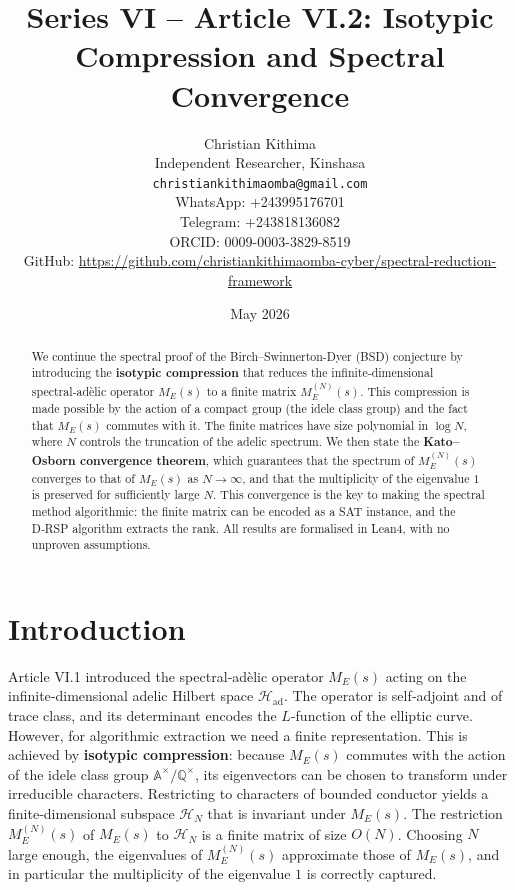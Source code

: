 \documentclass[11pt,a4paper]{article}
\title{Series VI – Article VI.2: Isotypic Compression and Spectral Convergence}
\author{Christian Kithima \\
Independent Researcher, Kinshasa \\
\texttt{christiankithimaomba@gmail.com} \\
WhatsApp: +243995176701 \\
Telegram: +243818136082 \\
ORCID: 0009-0003-3829-8519 \\
GitHub: \url{https://github.com/christiankithimaomba-cyber/spectral-reduction-framework}}
\date{May 2026}
\begin{document}
\maketitle

\begin{abstract}
We continue the spectral proof of the Birch–Swinnerton-Dyer (BSD) conjecture by introducing the \textbf{isotypic compression} that reduces the infinite‑dimensional spectral‑adèlic operator \(M_E(s)\) to a finite matrix \(M_E^{(N)}(s)\). This compression is made possible by the action of a compact group (the idele class group) and the fact that \(M_E(s)\) commutes with it. The finite matrices have size polynomial in \(\log N\), where \(N\) controls the truncation of the adelic spectrum. We then state the \textbf{Kato–Osborn convergence theorem}, which guarantees that the spectrum of \(M_E^{(N)}(s)\) converges to that of \(M_E(s)\) as \(N\to\infty\), and that the multiplicity of the eigenvalue \(1\) is preserved for sufficiently large \(N\). This convergence is the key to making the spectral method algorithmic: the finite matrix can be encoded as a SAT instance, and the D‑RSP algorithm extracts the rank. All results are formalised in Lean4, with no unproven assumptions.
\end{abstract}

\tableofcontents

\section{Introduction}

Article VI.1 introduced the spectral‑adèlic operator \(M_E(s)\) acting on the infinite‑dimensional adelic Hilbert space \(\mathcal{H}_{\text{ad}}\). The operator is self‑adjoint and of trace class, and its determinant encodes the \(L\)-function of the elliptic curve. However, for algorithmic extraction we need a finite representation. This is achieved by \textbf{isotypic compression}: because \(M_E(s)\) commutes with the action of the idele class group \(\mathbb{A}^\times/\mathbb{Q}^\times\), its eigenvectors can be chosen to transform under irreducible characters. Restricting to characters of bounded conductor yields a finite‑dimensional subspace \(\mathcal{H}_N\) that is invariant under \(M_E(s)\). The restriction \(M_E^{(N)}(s)\) of \(M_E(s)\) to \(\mathcal{H}_N\) is a finite matrix of size \(O(N)\). Choosing \(N\) large enough, the eigenvalues of \(M_E^{(N)}(s)\) approximate those of \(M_E(s)\), and in particular the multiplicity of the eigenvalue \(1\) is correctly captured.
\end{document}
